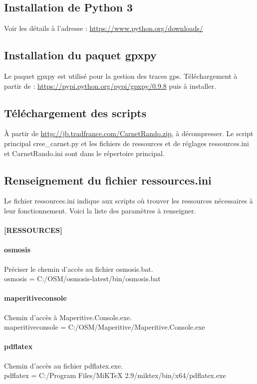 \documentclass[12pt,french]{article}
\begin{document}
\subsection{Installation de Python 3}
Voir les détails à l'adresse : \url{https://www.python.org/downloads/}

\subsection{Installation du paquet gpxpy} 
Le paquet gpxpy est utilisé pour la gestion des traces gps. Téléchargement à partir de : \url{https://pypi.python.org/pypi/gpxpy/0.9.8} puis à installer.

\subsection{Téléchargement des scripts}
À partir de \url{http://jb.tradfrance.com/CarnetRando.zip}, à décompresser. Le script principal cree\_carnet.py et les fichiers de ressources et de réglages ressources.ini et CarnetRando.ini sont dans le répertoire principal.

\subsection{Renseignement du fichier ressources.ini}
Le fichier ressources.ini indique aux scripts où trouver les ressources nécessaires à leur fonctionnement. Voici la liste des paramètres à renseigner. \par

\paragraph{[RESSOURCES]}
\paragraph{osmosis} Préciser le chemin d'accès au fichier osmosis.bat. \\
osmosis = C:/OSM/osmosis-latest/bin/osmosis.bat
\paragraph{maperitiveconsole} Chemin d'accès à Maperitive.Console.exe.\\
maperitiveconsole = C:/OSM/Maperitive/Maperitive.Console.exe
\paragraph{pdflatex} Chemin d'accès au fichier pdflatex.exe.\\
pdflatex = C:/Program Files/MiKTeX 2.9/miktex/bin/x64/pdflatex.exe
\end{document}
